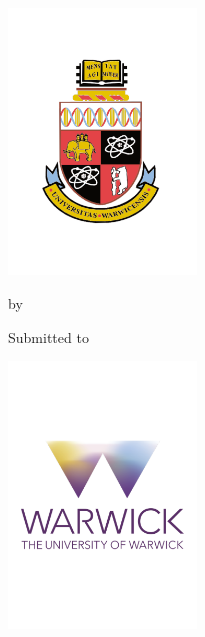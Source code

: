 \begin{titlepage}
\begin{center}
\includegraphics[width=5cm]{Warwick_Crest} 

\vspace*{20pt}
\begin{spacing}{2}
\begin{center}
{\Large \bf \TheTitle} %

\vspace*{14pt}

by

{\Large \bf \TheAuthor} %

\vspace*{16pt}

{\large \bf \TheModule} %


Submitted to \TheUni %

\vspace*{36pt}
{\Large \bf \TheDept} %

\TheSubDate %

\vspace*{36pt}
\includegraphics[width=5cm]{warwick_logo} 

\end{center}
\end{spacing}
\end{center}
\end{titlepage}
